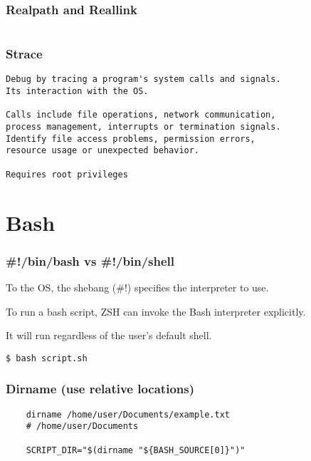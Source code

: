 \begin{verbatim}
\end{verbatim}

\subsection{Realpath and Reallink}

\begin{verbatim}
\end{verbatim}

\subsection{Strace}

\begin{verbatim}
Debug by tracing a program's system calls and signals.
Its interaction with the OS.

Calls include file operations, network communication,
process management, interrupts or termination signals.
Identify file access problems, permission errors,
resource usage or unexpected behavior. 

Requires root privileges
\end{verbatim}

\chapter{Bash}

\subsection{\#!/bin/bash vs \#!/bin/shell}

To the OS, the shebang (\#!) specifies the interpreter to use.

To run a bash script, ZSH can invoke the Bash interpreter explicitly.

It will run regardless of the user's default shell.

\begin{verbatim}
$ bash script.sh
\end{verbatim}

\subsection{Dirname (use relative locations)}

\begin{verbatim}
    dirname /home/user/Documents/example.txt
    # /home/user/Documents

    SCRIPT_DIR="$(dirname "${BASH_SOURCE[0]}")"
\end{verbatim}

